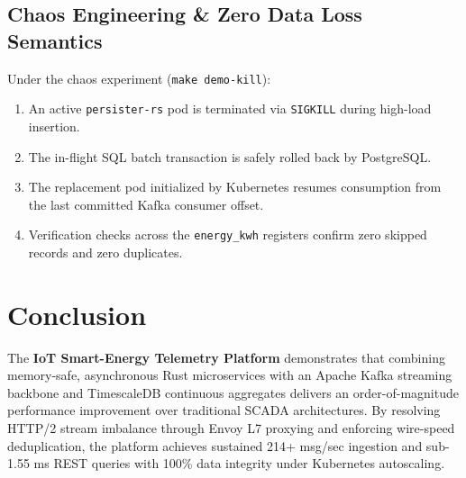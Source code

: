 \documentclass[11pt,a4paper]{article}
\begin{document}
\subsection{Chaos Engineering \& Zero Data Loss Semantics}
Under the chaos experiment (\texttt{make demo-kill}):
\begin{enumerate}
    \item An active \texttt{persister-rs} pod is terminated via \texttt{SIGKILL} during high-load insertion.
    \item The in-flight SQL batch transaction is safely rolled back by PostgreSQL.
    \item The replacement pod initialized by Kubernetes resumes consumption from the last committed Kafka consumer offset.
    \item Verification checks across the \texttt{energy\_kwh} registers confirm zero skipped records and zero duplicates.
\end{enumerate}

\section{Conclusion}

The \textbf{IoT Smart-Energy Telemetry Platform} demonstrates that combining memory-safe, asynchronous Rust microservices with an Apache Kafka streaming backbone and TimescaleDB continuous aggregates delivers an order-of-magnitude performance improvement over traditional SCADA architectures. By resolving HTTP/2 stream imbalance through Envoy L7 proxying and enforcing wire-speed deduplication, the platform achieves sustained 214+ msg/sec ingestion and sub-1.55 ms REST queries with 100\% data integrity under Kubernetes autoscaling.
\end{document}
